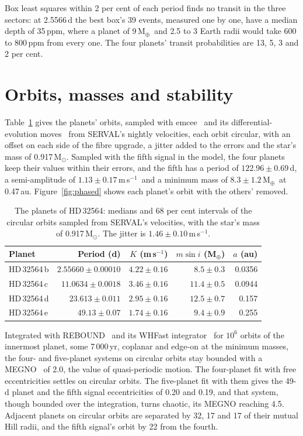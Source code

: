 \documentclass[3p,11pt]{elsarticle}
\newcommand{\ms}{m\,s$^{-1}$}
\newcommand{\Msun}{M$_\odot$}
\newcommand{\Mearth}{M$_\oplus$}
\begin{document}
Box least squares within 2 per cent of each period finds no transit in the three sectors: at 2.5566\,d
the best box's 39 events, measured one by one, have a median depth of 35\,ppm, where a planet of
9\,\Mearth\ and 2.5 to 3 Earth radii would take 600 to 800\,ppm from every one. The four planets' transit
probabilities are 13, 5, 3 and 2 per cent.

\section{Orbits, masses and stability}\label{sec:orbits}

Table~\ref{tab:orbits} gives the planets' orbits, sampled with emcee~\cite{ForemanMackey2013} and its
differential-evolution moves~\cite{terBraak2006} from SERVAL's nightly velocities, each orbit circular,
with an offset on each side of the fibre upgrade, a jitter added to the errors and the star's mass of
0.917\,\Msun. Sampled with the fifth signal in the model, the four planets keep their values within
their errors, and the fifth has a period of $122.96 \pm 0.69$\,d, a semi-amplitude of
$1.13 \pm 0.17$\,\ms\ and a minimum mass of $8.3 \pm 1.2$\,\Mearth\ at 0.47\,au.
Figure~\ref{fig:phased} shows each planet's orbit with the others' removed.

\begin{table}[!htbp]
\centering
\caption{The planets of HD\,32564: medians and 68 per cent intervals of the circular orbits sampled from
SERVAL's velocities, with the star's mass of 0.917\,\Msun. The jitter is $1.46 \pm 0.10$\,\ms.}
\label{tab:orbits}
\begin{tabular}{l r r r r}
\toprule
Planet & Period (d) & $K$ (\ms) & $m \sin i$ (\Mearth) & $a$ (au) \\
\midrule
HD\,32564\,b & $2.55660 \pm 0.00010$ & $4.22 \pm 0.16$ & $8.5 \pm 0.3$ & 0.0356 \\
HD\,32564\,c & $11.0634 \pm 0.0018$ & $3.46 \pm 0.16$ & $11.4 \pm 0.5$ & 0.0944 \\
HD\,32564\,d & $23.613 \pm 0.011$ & $2.95 \pm 0.16$ & $12.5 \pm 0.7$ & 0.157 \\
HD\,32564\,e & $49.13 \pm 0.07$ & $1.74 \pm 0.16$ & $9.4 \pm 0.9$ & 0.255 \\
\bottomrule
\end{tabular}
\end{table}

Integrated with REBOUND~\cite{Rein2012} and its WHFast integrator~\cite{Rein2015} for $10^6$ orbits of
the innermost planet, some 7\,000\,yr, coplanar and edge-on at the minimum masses, the four- and
five-planet systems on circular orbits stay bounded with a MEGNO~\cite{Cincotta2000} of 2.0, the value
of quasi-periodic motion. The four-planet fit with free eccentricities settles on circular orbits. The
five-planet fit with them gives the 49-d planet and the fifth signal eccentricities of 0.20 and 0.19,
and that system, though bounded over the integration, turns chaotic, its MEGNO reaching 4.5. Adjacent
planets on circular orbits are separated by 32, 17 and 17 of their mutual Hill radii, and the fifth
signal's orbit by 22 from the fourth.
\end{document}
